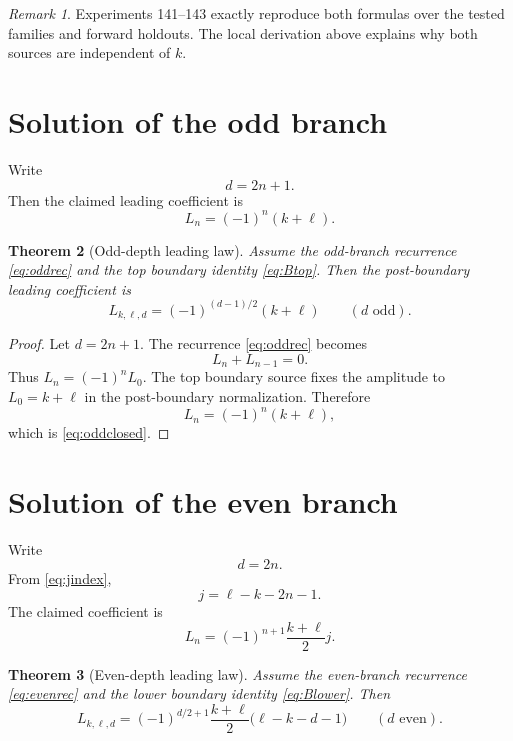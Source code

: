 \documentclass[11pt]{article}
\newtheorem{theorem}{Theorem}[section]
\theoremstyle{remark}
\newtheorem{remark}[theorem]{Remark}
\theoremstyle{definition}
\newcommand{\Lkl}{L_{k,\ell,d}}
\begin{document}
\begin{remark}
Experiments 141--143 exactly reproduce both formulas over the tested families
and forward holdouts. The local derivation above explains why both sources are
independent of $k$.
\end{remark}

\section{Solution of the odd branch}

Write
\[
d=2n+1.
\]
Then the claimed leading coefficient is
\begin{equation}
L_n=(-1)^n(k+\ell).
\label{eq:oddclosed}
\end{equation}

\begin{theorem}[Odd-depth leading law]
Assume the odd-branch recurrence \eqref{eq:oddrec} and the top boundary
identity \eqref{eq:Btop}.  Then the post-boundary leading coefficient is
\begin{equation}
\boxed{
\Lkl=(-1)^{(d-1)/2}(k+\ell)
}
\qquad(d\text{ odd}).
\end{equation}
\end{theorem}

\begin{proof}
Let $d=2n+1$.  The recurrence \eqref{eq:oddrec} becomes
\[
L_n+L_{n-1}=0.
\]
Thus $L_n=(-1)^nL_0$.  The top boundary source fixes the amplitude to
$L_0=k+\ell$ in the post-boundary normalization. Therefore
\[
L_n=(-1)^n(k+\ell),
\]
which is \eqref{eq:oddclosed}.
\end{proof}

\section{Solution of the even branch}

Write
\[
d=2n.
\]
From \eqref{eq:jindex},
\begin{equation}
j=\ell-k-2n-1.
\label{eq:jeven}
\end{equation}
The claimed coefficient is
\begin{equation}
L_n=(-1)^{n+1}\frac{k+\ell}{2}j.
\label{eq:evenclosed}
\end{equation}

\begin{theorem}[Even-depth leading law]
Assume the even-branch recurrence \eqref{eq:evenrec} and the lower boundary
identity \eqref{eq:Blower}.  Then
\begin{equation}
\boxed{
\Lkl=
(-1)^{d/2+1}\frac{k+\ell}{2}
\bigl(\ell-k-d-1\bigr)
}
\qquad(d\text{ even}).
\end{equation}
\end{theorem}
\end{document}
